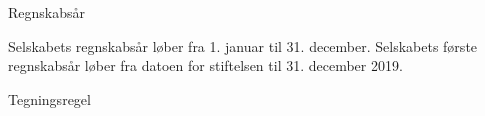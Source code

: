 \begin{enum}
    \item Regnskabsår
    \begin{enum}
        \item Selskabets regnskabsår løber fra 1. januar til 31. december. Selskabets første regnskabsår løber fra datoen for stiftelsen til 31. december 2019.    
    \end{enum}


    \item Tegningsregel
    \begin{enum}
        \item \@tegningsregel
    \end{enum}
\end{enum}

